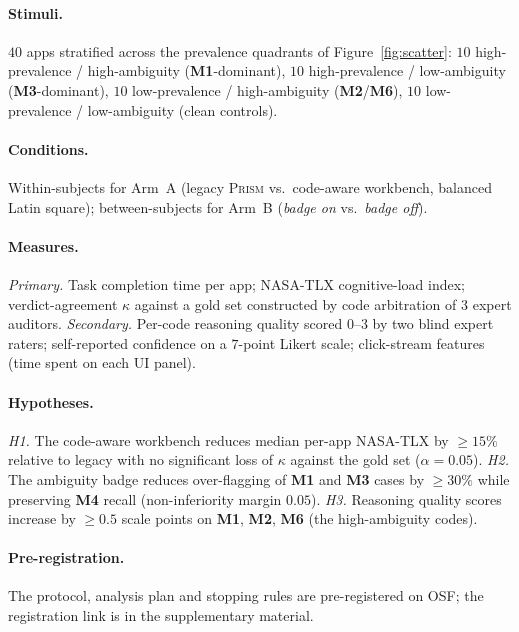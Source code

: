 \documentclass[11pt,a4paper]{article}
\newcommand{\prism}{\textsc{Prism}}
\newcommand{\code}[1]{\textsf{\textbf{#1}}}
\begin{document}
\paragraph{Stimuli.} $40$ apps stratified across the prevalence
quadrants of Figure~\ref{fig:scatter}: $10$ high-prevalence /
high-ambiguity (\code{M1}-dominant), $10$ high-prevalence /
low-ambiguity (\code{M3}-dominant), $10$ low-prevalence /
high-ambiguity (\code{M2}/\code{M6}), $10$ low-prevalence /
low-ambiguity (clean controls).

\paragraph{Conditions.} Within-subjects for Arm~A
(legacy \prism{} vs.\ code-aware workbench, balanced Latin
square); between-subjects for Arm~B
(\emph{badge on} vs.\ \emph{badge off}).

\paragraph{Measures.}
\emph{Primary.} Task completion time per app; NASA-TLX
\citep{hart2008measurement} cognitive-load index; verdict-agreement
$\kappa$ against a gold set constructed by code arbitration of $3$
expert auditors. \emph{Secondary.} Per-code reasoning quality scored
$0$--$3$ by two blind expert raters; self-reported confidence on a
$7$-point Likert scale; click-stream features (time spent on each UI
panel).

\paragraph{Hypotheses.}
\emph{H1.} The code-aware workbench reduces median per-app NASA-TLX
by $\geq 15\%$ relative to legacy with no significant loss of $\kappa$
against the gold set ($\alpha=0.05$).
\emph{H2.} The ambiguity badge reduces over-flagging of \code{M1} and
\code{M3} cases by $\geq 30\%$ while preserving \code{M4} recall
(non-inferiority margin $0.05$).
\emph{H3.} Reasoning quality scores increase by $\geq 0.5$ scale
points on \code{M1}, \code{M2}, \code{M6} (the high-ambiguity codes).

\paragraph{Pre-registration.} The protocol, analysis plan and stopping
rules are pre-registered on OSF; the registration link is in the
supplementary material.
\end{document}
